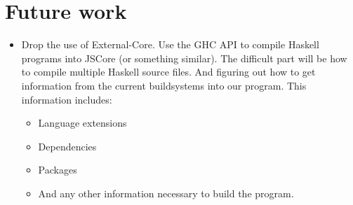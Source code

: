 
\section{Future work}



\begin{itemize}

\item Drop the use of External-Core. Use the GHC API to compile Haskell programs
into JSCore (or something similar). The difficult part will be how to compile
multiple Haskell source files. And figuring out how to get information from the
current buildsystems into our program. This information includes:

\begin{itemize}

\item Language extensions
\item Dependencies
\item Packages
\item And any other information necessary to build the program.

\end{itemize}

\end{itemize}
